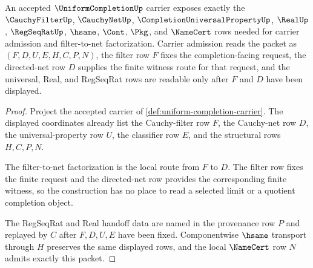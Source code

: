 \begin{theorem}
\label{thm:uniform-completion-filter-net-obligations}
An accepted $\UniformCompletionUp$ carrier exposes exactly the $\CauchyFilterUp$, $\CauchyNetUp$, $\CompletionUniversalPropertyUp$, $\RealUp$, $\RegSeqRatUp$, $\hsame$, $\Cont$, $\Pkg$, and $\NameCert$ rows needed for carrier admission and filter-to-net factorization. Carrier admission reads the packet as $(F,D,U,E,H,C,P,N)$, the filter row $F$ fixes the completion-facing request, the directed-net row $D$ supplies the finite witness route for that request, and the universal, Real, and RegSeqRat rows are readable only after $F$ and $D$ have been displayed.
\end{theorem}
\begin{proof}
Project the accepted carrier of \autoref{def:uniform-completion-carrier}. The displayed coordinates already list the Cauchy-filter row $F$, the Cauchy-net row $D$, the universal-property row $U$, the classifier row $E$, and the structural rows $H,C,P,N$.

The filter-to-net factorization is the local route from $F$ to $D$. The filter row fixes the finite request and the directed-net row provides the corresponding finite witness, so the construction has no place to read a selected limit or a quotient completion object.

The RegSeqRat and Real handoff data are named in the provenance row $P$ and replayed by $C$ after $F,D,U,E$ have been fixed. Componentwise $\hsame$ transport through $H$ preserves the same displayed rows, and the local $\NameCert$ row $N$ admits exactly this packet.
\end{proof}

